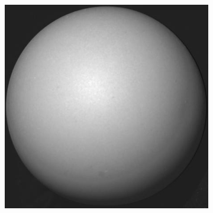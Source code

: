 \documentclass[11pt]{article}
\begin{document}
\begin{figure}[!hbt]
\begin{subfigure}[h]{0.3\textwidth}
  \end{subfigure} 
    \begin{subfigure}[h]{0.3\textwidth}
    \centering
    \includegraphics[width = \textwidth]{../sphere-images/real3.jpg}
  \end{subfigure} 
  

\end{figure}
\end{document}
